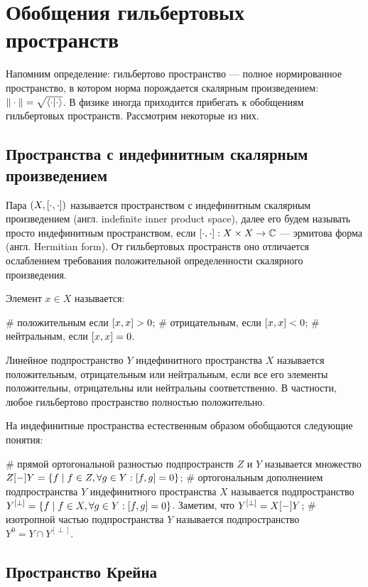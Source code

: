 \section{Обобщения гильбертовых пространств}
Напомним определение: гильбертово пространство — полное нормированное пространство, в котором норма порождается скалярным произведением: $\|\cdot\| = \sqrt{\ip{\cdot}{\cdot}}$. В физике иногда приходится прибегать к обобщениям гильбертовых пространств. Рассмотрим некоторые из них.

\subsection{Пространства с индефинитным скалярным произведением}
Пара $(X, [\cdot,\cdot])$ называется пространством с индефинитным скалярным произведением (англ. indefinite inner product space), далее его будем называть просто индефинитным пространством, если $[\cdot,\cdot]: X \times X \to \mathbb{C}$ — эрмитова форма (англ. Hermitian form). От гильбертовых пространств оно отличается ослаблением требования положительной определенности скалярного произведения.

Элемент $x \in X$ называется:
\begin{ilist}
# положительным если $[x,x] > 0$;
# отрицательным, если $[x,x] < 0$;
# нейтральным, если $[x,x] = 0$.
\end{ilist}

Линейное подпространство $Y$ индефинитного пространства $X$ называется положительным, отрицательным или нейтральным, если все его элементы положительны, отрицательны или нейтральны соответственно. В частности, любое гильбертово пространство полностью положительно.

На индефинитные пространства естественным образом обобщаются следующие понятия:
\begin{ilist}
# прямой ортогональной разностью подпространств $Z$ и $Y$ называется множество $Z [-] Y = \{f \mid f \in Z, \forall g \in Y: [f,g] = 0 \}$;
# ортогональным дополнением подпространства $Y$ индефинитного пространства $X$ называется подпространство $Y^{[\perp]} = \{f \mid f \in X, \forall g \in Y: [f,g] = 0 \}$. Заметим, что $Y^{[\perp]} = X [-] Y$;
# изотропной частью подпространства $Y$ называется подпространство $Y^0 = Y \cap Y^{[\perp]}$.
\end{ilist}

\subsection{Пространство Крейна}

